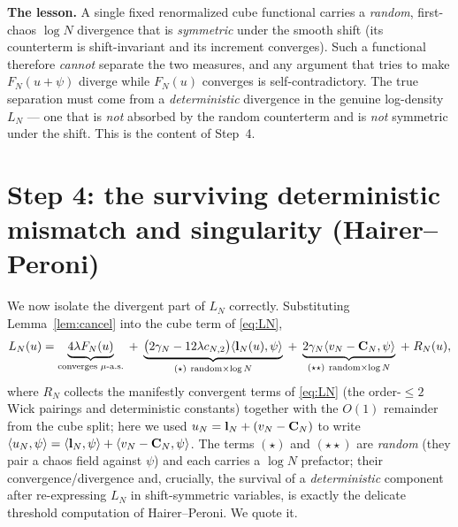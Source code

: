 \noindent\textbf{The lesson.} A single fixed renormalized cube functional carries a
\emph{random}, first-chaos $\log N$ divergence that is \emph{symmetric} under the smooth
shift (its counterterm is shift-invariant and its increment converges). Such a
functional therefore \emph{cannot} separate the two measures, and any argument that
tries to make $F_N(u+\psi)$ diverge while $F_N(u)$ converges is self-contradictory. The
true separation must come from a \emph{deterministic} divergence in the genuine
log-density $L_N$ --- one that is \emph{not} absorbed by the random counterterm and is
\emph{not} symmetric under the shift. This is the content of Step~4.

\section*{Step 4: the surviving deterministic mismatch and singularity (Hairer--Peroni)}

We now isolate the divergent part of $L_N$ correctly. Substituting Lemma~\ref{lem:cancel}
into the cube term of \eqref{eq:LN},
\begin{equation}\label{eq:LNsplit}
L_N(u)=\underbrace{4\lambda F_N(u)}_{\text{converges }\mu\text{-a.s.}}
\;+\;\underbrace{\bigl(2\gamma_N-12\lambda c_{N,2}\bigr)\langle\qoneLin_N(u),\psi\rangle}_{(\star)\ \text{random}\times\log N}
\;+\;\underbrace{2\gamma_N\langle v_N-\qoneIqc_N,\psi\rangle}_{(\star\star)\ \text{random}\times\log N}
\;+\;R_N(u),
\end{equation}
where $R_N$ collects the manifestly convergent terms of \eqref{eq:LN}
(the order-$\le2$ Wick pairings and deterministic constants) together with the
$O(1)$ remainder from the cube split; here we used
$u_N=\mathbf{l}_N+(v_N-\mathbf{C}_N)$ to write $\langle u_N,\psi\rangle=
\langle\mathbf{l}_N,\psi\rangle+\langle v_N-\mathbf{C}_N,\psi\rangle$. The terms $(\star)$
and $(\star\star)$ are \emph{random} (they pair a chaos field against $\psi$) and each
carries a $\log N$ prefactor; their convergence/divergence and, crucially, the survival
of a \emph{deterministic} component after re-expressing $L_N$ in shift-symmetric
variables, is exactly the delicate threshold computation of Hairer--Peroni. We quote it.

